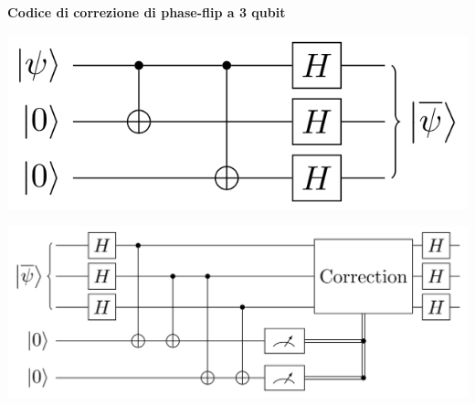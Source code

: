 \documentclass[aspectratio=169]{beamer}
\begin{document}
\begin{frame}
\begin{minipage}{\textwidth}
		\pause
		\hspace{-45pt}\textbf{Codice di correzione di phase-flip a 3 qubit}\\
		\begin{minipage}{0.30\textwidth}
			\centering
			\includegraphics[scale=0.22]{phase-flip-encode.png}
		\end{minipage}
		\begin{minipage}{0.68\textwidth}
			\centering
			\includegraphics[scale=0.2]{phase-flip-detect.png}
		\end{minipage}

	\end{minipage}
\end{frame}
\end{document}
